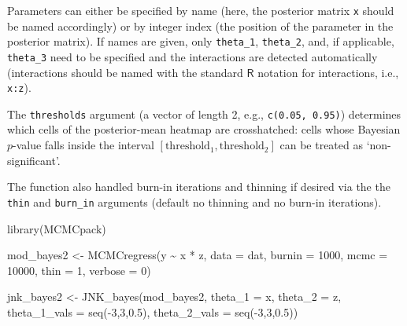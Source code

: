 \documentclass[
  letterpaper,
  DIV=11,
  numbers=noendperiod]{scrartcl}
\newenvironment{Shaded}{\begin{snugshade}}{\end{snugshade}}
\newcommand{\AttributeTok}[1]{\textcolor[rgb]{0.40,0.45,0.13}{#1}}
\newcommand{\DecValTok}[1]{\textcolor[rgb]{0.68,0.00,0.00}{#1}}
\newcommand{\FloatTok}[1]{\textcolor[rgb]{0.68,0.00,0.00}{#1}}
\newcommand{\FunctionTok}[1]{\textcolor[rgb]{0.28,0.35,0.67}{#1}}
\newcommand{\NormalTok}[1]{\textcolor[rgb]{0.00,0.23,0.31}{#1}}
\newcommand{\OtherTok}[1]{\textcolor[rgb]{0.00,0.23,0.31}{#1}}
\newcommand{\SpecialCharTok}[1]{\textcolor[rgb]{0.37,0.37,0.37}{#1}}
\newcommand{\StringTok}[1]{\textcolor[rgb]{0.13,0.47,0.30}{#1}}
\begin{document}
Parameters can either be specified by name (here, the posterior matrix
\texttt{x} should be named accordingly) or by integer index (the
position of the parameter in the posterior matrix). If names are given,
only \texttt{theta\_1}, \texttt{theta\_2}, and, if applicable,
\texttt{theta\_3} need to be specified and the interactions are detected
automatically (interactions should be named with the standard
\(\textsf{R}\) notation for interactions, i.e., \texttt{x:z}).

The \texttt{thresholds} argument (a vector of length 2, e.g.,
\texttt{c(0.05,\ 0.95)}) determines which cells of the posterior-mean
heatmap are crosshatched: cells whose Bayesian \(p\)-value falls inside
the interval \([\mathrm{threshold}_1, \mathrm{threshold}_2]\) can be
treated as `non-significant'.

The function also handled burn-in iterations and thinning if desired via
the the \texttt{thin} and \texttt{burn\_in} arguments (default no
thinning and no burn-in iterations).

\begin{Shaded}
\begin{Highlighting}[]
\FunctionTok{library}\NormalTok{(MCMCpack)}

\NormalTok{mod\_bayes2 }\OtherTok{\textless{}{-}} \FunctionTok{MCMCregress}\NormalTok{(y }\SpecialCharTok{\textasciitilde{}}\NormalTok{ x }\SpecialCharTok{*}\NormalTok{ z, }\AttributeTok{data =}\NormalTok{ dat,}
                          \AttributeTok{burnin =} \DecValTok{1000}\NormalTok{, }\AttributeTok{mcmc =} \DecValTok{10000}\NormalTok{, }\AttributeTok{thin =} \DecValTok{1}\NormalTok{,}
                          \AttributeTok{verbose =} \DecValTok{0}\NormalTok{)}


\NormalTok{jnk\_bayes2 }\OtherTok{\textless{}{-}} \FunctionTok{JNK\_bayes}\NormalTok{(mod\_bayes2, }\AttributeTok{theta\_1 =} \StringTok{\textquotesingle{}x\textquotesingle{}}\NormalTok{, }\AttributeTok{theta\_2 =} \StringTok{\textquotesingle{}z\textquotesingle{}}\NormalTok{,}
                        \AttributeTok{theta\_1\_vals =} \FunctionTok{seq}\NormalTok{(}\SpecialCharTok{{-}}\DecValTok{3}\NormalTok{,}\DecValTok{3}\NormalTok{,}\FloatTok{0.5}\NormalTok{), }
                        \AttributeTok{theta\_2\_vals =} \FunctionTok{seq}\NormalTok{(}\SpecialCharTok{{-}}\DecValTok{3}\NormalTok{,}\DecValTok{3}\NormalTok{,}\FloatTok{0.5}\NormalTok{))}
\end{Highlighting}
\end{Shaded}
\end{document}
